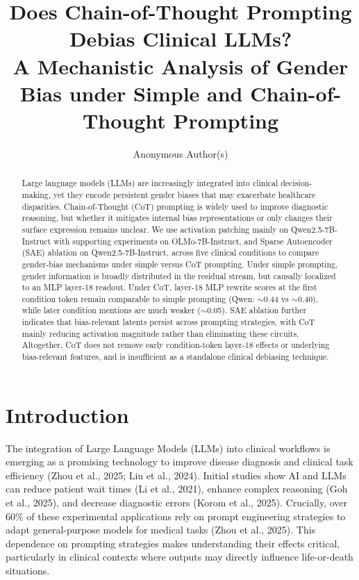 \documentclass{article}
\title{Does Chain-of-Thought Prompting Debias Clinical LLMs?\\
A Mechanistic Analysis of Gender Bias under Simple and Chain-of-Thought Prompting}
\author{Anonymous Author(s)}
\begin{document}
\maketitle

\begin{abstract}
Large language models (LLMs) are increasingly integrated into clinical decision-making, yet they encode persistent gender biases that may exacerbate healthcare disparities. Chain-of-Thought (CoT) prompting is widely used to improve diagnostic reasoning, but whether it mitigates internal bias representations or only changes their surface expression remains unclear. We use activation patching mainly on Qwen2.5-7B-Instruct with supporting experiments on OLMo-7B-Instruct, and Sparse Autoencoder (SAE) ablation on Qwen2.5-7B-Instruct, across five clinical conditions to compare gender-bias mechanisms under simple versus CoT prompting. Under simple prompting, gender information is broadly distributed in the residual stream, but causally localized to an MLP layer-18 readout. Under CoT, layer-18 MLP rewrite scores at the first condition token remain comparable to simple prompting (Qwen: $\sim$0.44 vs $\sim$0.40), while later condition mentions are much weaker ($\sim$0.05). SAE ablation further indicates that bias-relevant latents persist across prompting strategies, with CoT mainly reducing activation magnitude rather than eliminating these circuits. Altogether, CoT does not remove early condition-token layer-18 effects or underlying bias-relevant features, and is insufficient as a standalone clinical debiasing technique.
\end{abstract}

\section{Introduction}

The integration of Large Language Models (LLMs) into clinical workflows is emerging as a promising technology to improve disease diagnosis and clinical task efficiency (Zhou et al., 2025; Liu et al., 2024). Initial studies show AI and LLMs can reduce patient wait times (Li et al., 2021), enhance complex reasoning (Goh et al., 2025), and decrease diagnostic errors (Korom et al., 2025). Crucially, over 60\% of these experimental applications rely on prompt engineering strategies to adapt general-purpose models for medical tasks (Zhou et al., 2025). This dependence on prompting strategies makes understanding their effects critical, particularly in clinical contexts where outputs may directly influence life-or-death situations.
\end{document}
